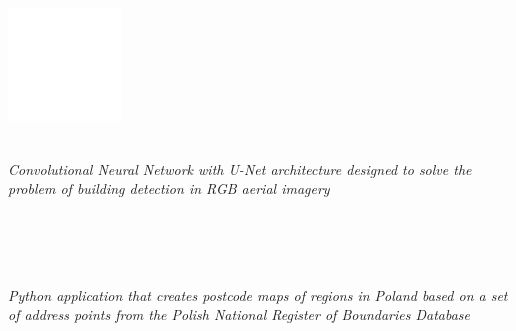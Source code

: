 \documentclass{cls/gml_cv_sets}
\begin{document}
\begin{paracol}{2}

\paracolbackgroundoptions
\footnotesize

{\setasidefontcolour

\vspace{-1em}

\begin{center}
    \includegraphics[height=3cm]{imgs/qr_code.png} \\
\end{center}
\vspace{-1em}

{\small

 \\

\textit{\footnotesize Convolutional Neural Network with U-Net architecture 
designed to solve the problem of building detection in RGB aerial 
imagery} \\ \vspace{-0.75em}

 \\
 \\ \vspace{0.6em}

 \\ 

\textit{\footnotesize Python application that creates postcode maps of regions
 in Poland based on a set of address points from the Polish National Register 
 of Boundaries Database} \\ \vspace{-0.75em}

}}
\end{paracol}
\end{document}
